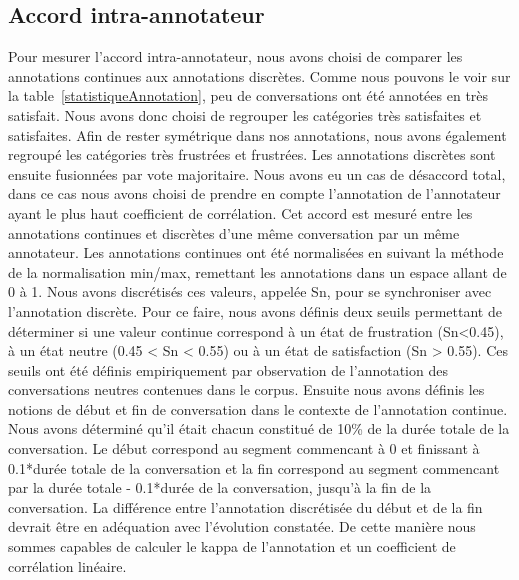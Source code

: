 \subsection{Accord intra-annotateur}
Pour mesurer l'accord intra-annotateur, nous avons choisi de comparer les annotations continues aux annotations discrètes. Comme nous pouvons le voir sur la table~\ref{statistiqueAnnotation}, peu de conversations ont été annotées en très satisfait. Nous avons donc choisi de regrouper les catégories très satisfaites et satisfaites. Afin de rester symétrique dans nos annotations, nous avons également regroupé les catégories très frustrées et frustrées. Les annotations discrètes sont ensuite fusionnées par vote majoritaire. Nous avons eu un cas de désaccord total, dans ce cas nous avons choisi de prendre en compte l'annotation de l'annotateur ayant le plus haut coefficient de corrélation.
Cet accord est mesuré entre les annotations continues et discrètes d'une même conversation par un même annotateur. Les annotations continues ont été normalisées en suivant la méthode de la normalisation min/max, remettant les annotations dans un espace allant de 0 à 1.
Nous avons discrétisés ces valeurs, appelée Sn, pour se synchroniser avec l'annotation discrète. Pour ce faire, nous avons définis deux seuils permettant de déterminer si une valeur continue correspond à un état de frustration (Sn<0.45), à un état neutre (0.45 < Sn < 0.55) ou à un état de satisfaction (Sn > 0.55). Ces seuils ont été définis empiriquement par observation de l'annotation des conversations neutres contenues dans le corpus.
Ensuite nous avons définis les notions de début et fin de conversation dans le contexte de l'annotation continue. Nous avons déterminé qu'il était chacun constitué de 10\% de la durée totale de la conversation. Le début correspond au segment commencant à 0 et finissant à 0.1*durée totale de la conversation et la fin correspond au segment commencant par la durée totale - 0.1*durée de la conversation, jusqu'à la fin de la conversation.
La différence entre l'annotation discrétisée du début et de la fin devrait être en adéquation avec l'évolution constatée. De cette manière nous sommes capables de calculer le kappa de l'annotation et un coefficient de corrélation linéaire.

